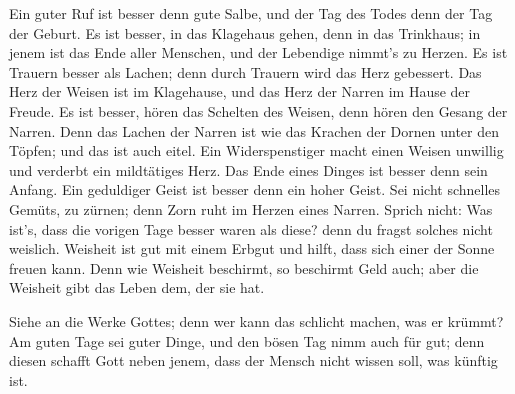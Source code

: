  Ein guter Ruf ist besser denn gute Salbe, und der Tag des
Todes denn der Tag der Geburt.  Es ist besser, in das
Klagehaus gehen, denn in das Trinkhaus; in jenem ist das Ende aller
Menschen, und der Lebendige nimmt's zu Herzen.  Es ist
Trauern besser als Lachen; denn durch Trauern wird das Herz gebessert.
 Das Herz der Weisen ist im Klagehause, und das Herz der
Narren im Hause der Freude.  Es ist besser, hören das
Schelten des Weisen, denn hören den Gesang der Narren. 
Denn das Lachen der Narren ist wie das Krachen der Dornen unter den
Töpfen; und das ist auch eitel.  Ein Widerspenstiger macht
einen Weisen unwillig und verderbt ein mildtätiges Herz. 
Das Ende eines Dinges ist besser denn sein Anfang. Ein geduldiger Geist
ist besser denn ein hoher Geist.  Sei nicht schnelles
Gemüts, zu zürnen; denn Zorn ruht im Herzen eines Narren.
 Sprich nicht: Was ist's, dass die vorigen Tage besser
waren als diese? denn du fragst solches nicht weislich. 
Weisheit ist gut mit einem Erbgut und hilft, dass sich einer der Sonne
freuen kann.  Denn wie Weisheit beschirmt, so beschirmt
Geld auch; aber die Weisheit gibt das Leben dem, der sie hat.

 Siehe an die Werke Gottes; denn wer kann das schlicht
machen, was er krümmt?  Am guten Tage sei guter Dinge,
und den bösen Tag nimm auch für gut; denn diesen schafft Gott neben
jenem, dass der Mensch nicht wissen soll, was künftig ist.

